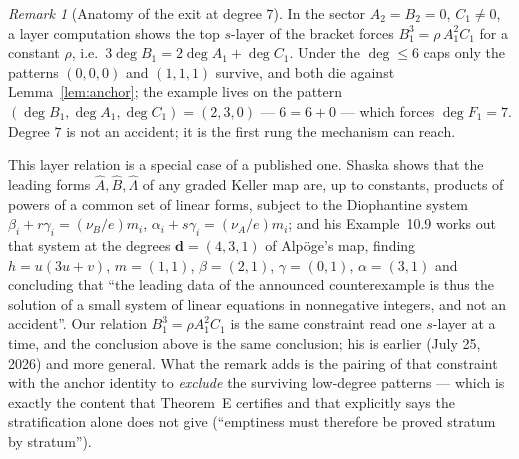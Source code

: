 \documentclass[11pt]{amsart}
\theoremstyle{plain}
\theoremstyle{definition}
\theoremstyle{remark}
\newtheorem{remark}[theorem]{Remark}
\begin{document}
\begin{remark}[Anatomy of the exit at degree $7$]
In the sector $A_{2}=B_{2}=0$, $C_{1}\neq0$, a layer computation shows
the top $s$-layer of the bracket forces $B_{1}^{3}=\rho\,A_{1}^{2}C_{1}$
for a constant $\rho$, i.e.\
$3\deg B_{1}=2\deg A_{1}+\deg C_{1}$. Under the $\deg\le6$ caps only the
patterns $(0,0,0)$ and $(1,1,1)$ survive, and both die against
Lemma~\ref{lem:anchor}; the example lives on the pattern
$(\deg B_{1},\deg A_{1},\deg C_{1})=(2,3,0)$ --- $6=6+0$ --- which forces
$\deg F_{1}=7$. Degree $7$ is not an accident; it is the first rung the
mechanism can reach.

This layer relation is a special case of a published one. Shaska
\cite[Thm.~10.6]{Shaska26} shows that the leading forms
$\hat A,\hat B,\hat\Lambda$ of any graded Keller map are, up to
constants, products of powers of a common set of linear forms, subject to
the Diophantine system
$\beta_{i}+r\gamma_{i}=(\nu_{B}/e)m_{i}$,
$\alpha_{i}+s\gamma_{i}=(\nu_{A}/e)m_{i}$; and his Example~10.9 works out
that system at the degrees $\mathbf d=(4,3,1)$ of Alp\"oge's map, finding
$h=u(3u+v)$, $m=(1,1)$, $\beta=(2,1)$, $\gamma=(0,1)$, $\alpha=(3,1)$ and
concluding that ``the leading data of the announced counterexample is thus
the solution of a small system of linear equations in nonnegative
integers, and not an accident''. Our relation
$B_{1}^{3}=\rho A_{1}^{2}C_{1}$ is the same constraint read one $s$-layer
at a time, and the conclusion above is the same conclusion; his is earlier
(July 25, 2026) and more general. What the remark adds is the pairing of
that constraint with the anchor identity to \emph{exclude} the surviving
low-degree patterns --- which is exactly the content that
Theorem~E certifies and that \cite[Rem.~10.8]{Shaska26} explicitly says
the stratification alone does not give (``emptiness must therefore be
proved stratum by stratum'').
\end{remark}
\end{document}
